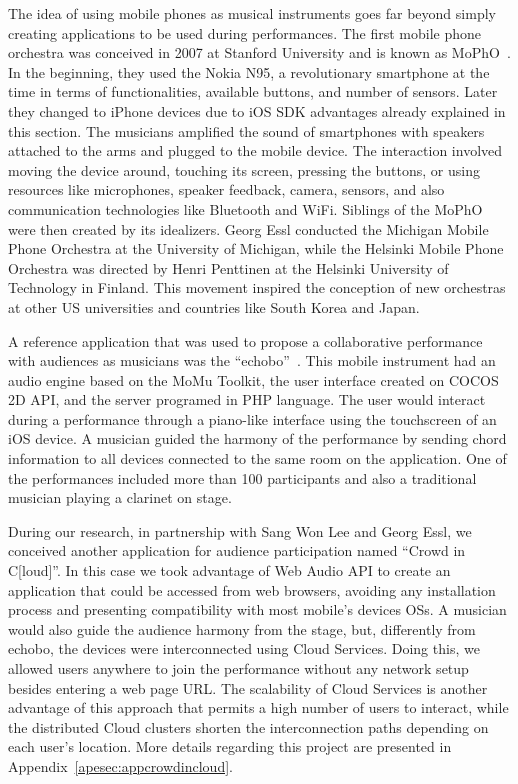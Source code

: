 The idea of using mobile phones as musical instruments goes far beyond simply creating applications to be used during performances.
The first mobile phone orchestra was conceived in 2007 at Stanford University and is known as MoPhO~\citep{Wang2008domobilephones}.
In the beginning, they used the Nokia N95, a revolutionary smartphone at the time in terms of functionalities, available buttons, and number of sensors.
Later they changed to iPhone devices due to iOS SDK advantages already explained in this section.
The musicians amplified the sound of smartphones with speakers attached to the arms and plugged to the mobile device.
The interaction involved moving the device around, touching its screen, pressing the buttons, or using resources like microphones, speaker feedback, camera, sensors, and also communication technologies like Bluetooth and WiFi.
Siblings of the MoPhO were then created by its idealizers.
Georg Essl conducted the Michigan Mobile Phone Orchestra at the University of Michigan, while the Helsinki Mobile Phone Orchestra was directed by Henri Penttinen at the Helsinki University of Technology in Finland.
This movement inspired the conception of new orchestras at other US universities and countries like South Korea and Japan.

A reference application that was used to propose a collaborative performance with audiences as musicians was the ``echobo''~\citep{Lee2013echobo}.
This mobile instrument had an audio engine based on the MoMu Toolkit, the user interface created on COCOS 2D API, and the server programed in PHP language. 
The user would interact during a performance through a piano-like interface using the touchscreen of an iOS device.
A musician guided the harmony of the performance by sending chord information to all devices connected to the same room on the application.
One of the performances included more than 100 participants and also a traditional musician playing a clarinet on stage.

During our research, in partnership with Sang Won Lee and Georg Essl, we conceived another application for audience participation named ``Crowd in C[loud]''.
In this case we took advantage of Web Audio API to create an application that could be accessed from web browsers, avoiding any installation process and presenting compatibility with most mobile's devices OSs.
A musician would also guide the audience harmony from the stage, but, differently from echobo, the devices were interconnected using Cloud Services.
Doing this, we allowed users anywhere to join the performance without any network setup besides entering a web page URL.
The scalability of Cloud Services is another advantage of this approach that permits a high number of users to interact, while the distributed Cloud clusters shorten the interconnection paths depending on each user's location.
More details regarding this project are presented in Appendix~\ref{apesec:appcrowdincloud}.

